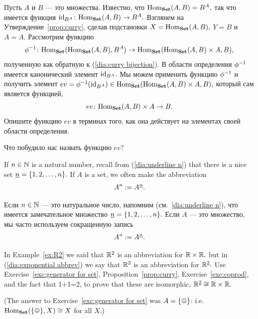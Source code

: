 \documentclass[CT4S-EN-RU]{subfiles}
\begin{document}
\begin{exerciseRUS}\label{exc:evaluation}
Пусть $A$ и $B$ — это множества. Известно, что $\textnormal{Hom}_{\mathbf{Set}}(A,B)=B^A,$ так что имеется функция $\textnormal{id}_{B^A}\colon\textnormal{Hom}_{\mathbf{Set}}(A,B)\rightarrow B^A.$ Взглянем на Утверждение~\ref{prop:curry}, сделав подстановки $X=\textnormal{Hom}_{\mathbf{Set}}(A,B),$ $Y=B$ и  $A=A.$ Рассмотрим функцию $$\phi^\m1\taking\Hom_\Set(\Hom_\Set(A,B),B^A)\to\Hom_\Set(\Hom_\Set(A,B)\times A,B),$$ полученную как обратную к (\ref{dia:curry bijection}). В области определения $\phi^\m1$ имеется канонический элемент $\textnormal{id}_{B^A}.$ Мы можем применить функцию $\phi^\m1$ и получить элемент $ev=\phi^\m1(\id_{B^A})\in\Hom_\Set(\Hom_\Set(A,B)\times A,B),$ который сам является функцией, $$ev\colon\textnormal{Hom}_{\mathbf{Set}}(A,B)\times A\rightarrow B.$$ 
\sexc Опишите функцию $ev$ в терминах того, как она действует на элементах своей области определения. 
\item Что побудило нас назвать функцию $ev?$%
\endsexc
\end{exerciseRUS}

\begin{blockENG}
If $n\in{\mathbb N}$ is a natural number, recall from (\ref{dia:underline n}) that there is a nice set $\underline{n}=\{1,2,\ldots,n\}.$ If $A$ is a set, we often make the abbreviation 
\begin{align}\label{dia:exponential abbrev}
A^n:=A^{\underline{n}}.
\end{align}
\end{blockENG}

\begin{blockRUS}
Если $n\in{\mathbb N}$ — это натуральное число, напомним (см.~\ref{dia:underline n}), что имеется замечательное множество $\underline{n}=\{1,2,\ldots,n\}.$ Если $A$ — это множество, мы часто используем сокращенную запись
\begin{align}\label{dia:exponential abbrev}
A^n:=A^{\underline{n}}.
\end{align}
\end{blockRUS}

\begin{exerciseENG}\label{exc:two R2s}
In Example~\ref{ex:R2} we said that ${\mathbb R}^2$ is an abbreviation for ${\mathbb R}\times{\mathbb R},$ but in (\ref{dia:exponential abbrev}) we say that ${\mathbb R}^2$ is an abbreviation for ${\mathbb R}^{\underline{2}}.$ Use Exercise~\ref{exc:generator for set}, Proposition~\ref{prop:curry}, Exercise~\ref{exc:coprod}, and the fact that 1+1=2, to prove that these are isomorphic, ${\mathbb R}^{\underline{2}}\cong{\mathbb R}\times{\mathbb R}.$

(The answer to Exercise~\ref{exc:generator for set} was $A=\singleton$: i.e. $\Hom_\Set(\singleton,X)\iso X$ for all $X.$)
\end{exerciseENG}
\end{document}
